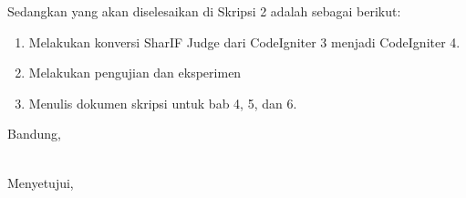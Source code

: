 \documentclass[a4paper,twoside]{article}
\begin{document}
Sedangkan yang akan diselesaikan di Skripsi 2 adalah sebagai berikut:
\begin{enumerate}
\item Melakukan konversi SharIF Judge dari CodeIgniter 3 menjadi CodeIgniter 4.
\item Melakukan pengujian dan eksperimen
\item Menulis dokumen skripsi untuk bab 4, 5, dan 6.
\end{enumerate}

\vspace{1cm}
\centering Bandung, \tanggal\\
\vspace{2cm} \nama \\ 
\vspace{1cm}

Menyetujui, \\
\end{document}
